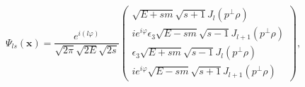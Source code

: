\begin{equation}
\Psi _{ls}(\mathbf{x})=\frac{e^{i(l\varphi )}}{\sqrt{2\pi }\sqrt{2E}\sqrt{2s}%
}\left(
\begin{array}{c}
\sqrt{E+sm}\sqrt{s+1}J_{l}\left( p^{\bot }\rho \right) \\
ie^{i\varphi }\epsilon _{3}\sqrt{E-sm}\sqrt{s-1}J_{l+1}\left( p^{\bot }\rho
\right) \\
\epsilon _{3}\sqrt{E+sm}\sqrt{s-1}J_{l}\left( p^{\bot }\rho \right) \\
ie^{i\varphi }\sqrt{E-sm}\sqrt{s+1}J_{l+1}\left( p^{\bot }\rho \right)
\end{array}
\right) ,
\label{eq30}
\end{equation}

